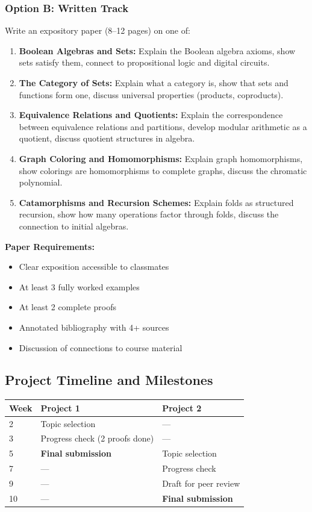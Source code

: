 \documentclass[11pt]{article}
\begin{document}
\subsubsection{Option B: Written Track}
Write an expository paper (8--12 pages) on one of:
\begin{enumerate}
    \item \textbf{Boolean Algebras and Sets:} Explain the Boolean algebra axioms, show sets satisfy them, connect to propositional logic and digital circuits.

    \item \textbf{The Category of Sets:} Explain what a category is, show that sets and functions form one, discuss universal properties (products, coproducts).

    \item \textbf{Equivalence Relations and Quotients:} Explain the correspondence between equivalence relations and partitions, develop modular arithmetic as a quotient, discuss quotient structures in algebra.

    \item \textbf{Graph Coloring and Homomorphisms:} Explain graph homomorphisms, show colorings are homomorphisms to complete graphs, discuss the chromatic polynomial.

    \item \textbf{Catamorphisms and Recursion Schemes:} Explain folds as structured recursion, show how many operations factor through folds, discuss the connection to initial algebras.
\end{enumerate}

\textbf{Paper Requirements:}
\begin{itemize}
    \item Clear exposition accessible to classmates
    \item At least 3 fully worked examples
    \item At least 2 complete proofs
    \item Annotated bibliography with 4+ sources
    \item Discussion of connections to course material
\end{itemize}

\subsection{Project Timeline and Milestones}

\begin{center}
\begin{tabular}{lll}
\toprule
\textbf{Week} & \textbf{Project 1} & \textbf{Project 2} \\
\midrule
2 & Topic selection & --- \\
3 & Progress check (2 proofs done) & --- \\
5 & \textbf{Final submission} & Topic selection \\
7 & --- & Progress check \\
9 & --- & Draft for peer review \\
10 & --- & \textbf{Final submission} \\
\bottomrule
\end{tabular}
\end{center}
\end{document}
